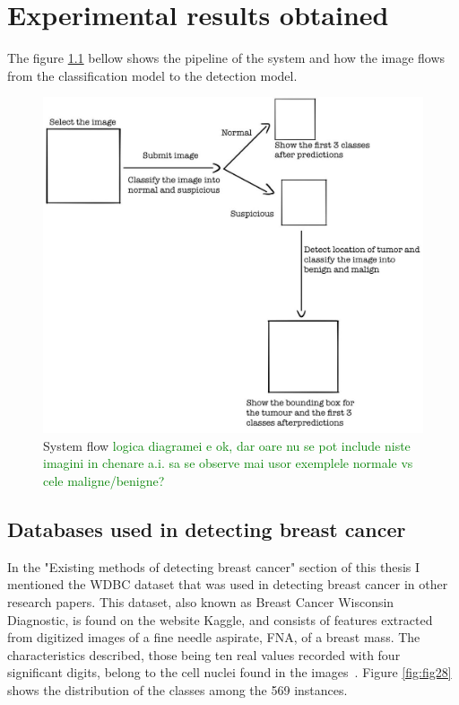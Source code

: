 \chapter{Experimental results obtained}
\label{chap:ch4}

The figure \ref{fig:fig33} bellow shows the pipeline of the system and how the image flows from the classification model to the detection model.

\begin{figure}[H]
    \centering
    \includegraphics[width=0.7\linewidth]{figures/Figure38.png}
    \caption{System flow
    \textcolor{green}{logica diagramei e ok, dar oare nu se pot include niste imagini in chenare a.i. sa se observe mai usor exemplele normale vs cele maligne/benigne?}
    }
    \label{fig:fig33}
\end{figure}


\section{Databases used in detecting breast cancer}

In the "Existing methods of detecting breast cancer" section of this thesis
I mentioned the WDBC dataset that was used in detecting breast cancer in other research papers. This dataset, also known as Breast Cancer Wisconsin Diagnostic, is found on the website Kaggle, and consists of features extracted from digitized images of a fine needle aspirate, FNA, of a breast mass. The characteristics described, those being ten real values recorded with four significant digits, belong to the cell nuclei found in the images~\cite{link9}. 
Figure \ref{fig:fig28} shows the distribution of the classes among the 569 instances.

